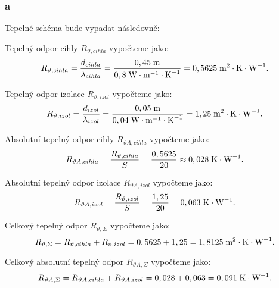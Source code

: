 \documentclass{article}
\begin{document}
\subsubsection{a}
Tepelné schéma bude vypadat následovně:

\begin{center}
\end{center}

Tepelný odpor cihly $R_{\vartheta,cihla}$ vypočteme jako:
$$
    R_{\vartheta,cihla} = \frac{d_{cihla}}{\lambda_{cihla}} = \frac{0,45 \; \textrm{m}}{0,8 \; \textrm{W} \cdot \textrm{m}^{-1} \cdot \textrm{K}^{-1}} = 0,5625 \; \textrm{m}^{\textrm{2}} \cdot \textrm{K} \cdot \textrm{W}^{-1}.
$$

Tepelný odpor izolace $R_{\vartheta,izol}$ vypočteme jako:
$$
    R_{\vartheta,izol} = \frac{d_{izol}}{\lambda_{izol}} = \frac{0,05 \; \textrm{m}}{0,04 \; \textrm{W} \cdot \textrm{m}^{-1} \cdot \textrm{K}^{-1}} = 1,25 \; \textrm{m}^{\textrm{2}} \cdot \textrm{K} \cdot \textrm{W}^{-1}.
$$

Absolutní tepelný odpor cihly $R_{\vartheta A,cihla}$ vypočteme jako:
$$
    R_{\vartheta A,cihla} = \frac{R_{\vartheta,cihla}}{S} = \frac{0,5625}{20} \approx 0,028 \; \textrm{K} \cdot \textrm{W}^{-1}.
$$

Absolutní tepelný odpor izolace $R_{\vartheta A,izol}$ vypočteme jako:
$$
    R_{\vartheta A,izol} = \frac{R_{\vartheta,izol}}{S} = \frac{1,25}{20} = 0,063 \; \textrm{K} \cdot \textrm{W}^{-1}.
$$

Celkový tepelný odpor $R_{\vartheta,\Sigma}$ vypočteme jako:
$$
    R_{\vartheta,\Sigma} = R_{\vartheta,cihla} + R_{\vartheta,izol} = 0,5625 + 1,25 = 1,8125 \; \textrm{m}^{\textrm{2}} \cdot \textrm{K} \cdot \textrm{W}^{-1}.
$$

Celkový absolutní tepelný odpor $R_{\vartheta A,\Sigma}$ vypočteme jako:
$$
    R_{\vartheta A,\Sigma} = R_{\vartheta A,cihla} + R_{\vartheta A,izol} = 0,028 + 0,063 = 0,091 \; \textrm{K} \cdot \textrm{W}^{-1}.
$$
\end{document}
